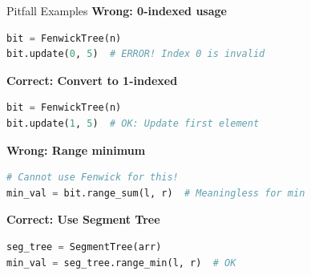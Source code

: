 \documentclass[aspectratio=169]{beamer}
\begin{document}
\begin{frame}[fragile]{Pitfall Examples}
  \textbf{Wrong: 0-indexed usage}
  \begin{lstlisting}[language=Python, basicstyle=\ttfamily\footnotesize]
bit = FenwickTree(n)
bit.update(0, 5)  # ERROR! Index 0 is invalid
  \end{lstlisting}

  \textbf{Correct: Convert to 1-indexed}
  \begin{lstlisting}[language=Python, basicstyle=\ttfamily\footnotesize]
bit = FenwickTree(n)
bit.update(1, 5)  # OK: Update first element
  \end{lstlisting}

  \vspace{0.5cm}
  \textbf{Wrong: Range minimum}
  \begin{lstlisting}[language=Python, basicstyle=\ttfamily\footnotesize]
# Cannot use Fenwick for this!
min_val = bit.range_sum(l, r)  # Meaningless for min
  \end{lstlisting}

  \textbf{Correct: Use Segment Tree}
  \begin{lstlisting}[language=Python, basicstyle=\ttfamily\footnotesize]
seg_tree = SegmentTree(arr)
min_val = seg_tree.range_min(l, r)  # OK
  \end{lstlisting}
\end{frame}
\end{document}
